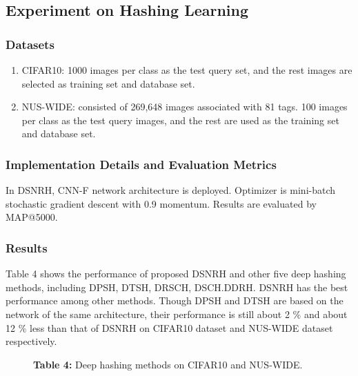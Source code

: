 \documentclass[12pt,paper=a4]{scrartcl}
\theoremstyle{break}
\begin{document}
\subsection{Experiment on Hashing Learning}
\subsubsection{Datasets}
\begin{enumerate}
\item CIFAR10: 1000 images per class as the test query set, and the rest images are selected as training set and database set.
\item NUS-WIDE: consisted of 269,648 images associated with 81 tags. 100 images per class as the test query images, and the rest  are used as the training set and database set.
\end{enumerate}
\subsubsection{Implementation Details and  Evaluation Metrics}
In DSNRH, CNN-F network architecture is deployed. Optimizer is mini-batch stochastic  gradient descent with 0.9 momentum. Results are evaluated by MAP@5000.
\subsubsection{Results}
Table 4 shows the performance of proposed DSNRH and other five deep hashing methods, including DPSH, DTSH, DRSCH, DSCH.DDRH. DSNRH has the best performance among other methods. Though DPSH and DTSH are based on the network of the same architecture, their performance is still about 2 $\%$ and about 12 $\%$ less than that of DSNRH on CIFAR10 dataset and NUS-WIDE dataset respectively.
\begin{figure}[h]%
  \centering
  \caption{\textbf{Table 4:} Deep hashing methods on CIFAR10 and NUS-WIDE.\cite{source1}}%
\end{figure}
\end{document}
